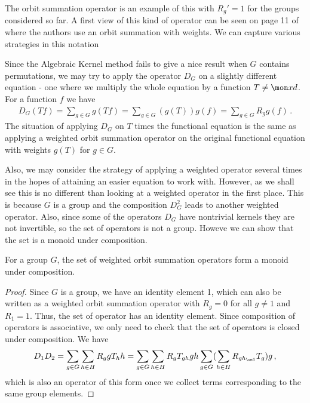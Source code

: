 The orbit summation operator is an example of this with $R_g' = 1$ for the groups considered so far. A first view of this kind of operator can be seen on page 11 of \cite{wong2014confining} where the authors use an orbit summation with weights. We can capture various strategies in this notation
\begin{example} Since the Algebraic Kernel method fails to give a nice result when $G$ contains permutations, we may try to apply the operator $D_G$ on a slightly different equation - one where we multiply the whole equation by a function $T \neq \mon xd$. For a function $f$ we have
\begin{align}
	D_G(Tf) = \sum_{g\in G}g(T f) = \sum_{g\in G} ( g(T)) g(f) =  \sum_{g\in G} R_g g(f)\,.
\end{align}
The situation of applying $D_G$ on $T$ times the functional equation is the same as applying a weighted orbit summation operator on the original functional equation with weights $g(T)$ for $g \in G$.
\end{example}
Also, we may consider the strategy of applying a weighted operator several times in the hopes of attaining an easier equation to work with. However, as we shall see this is no different than looking at a weighted operator in the first place. This is because $G$ is a group and the composition $D_G^2$ leads to another weighted operator. Also, since some of the operators $D_G$ have nontrivial kernels they are not invertible, so the set of operators is not a group. Howeve we can show that the set is a monoid under composition.
\begin{prop} For a group $G$, the set of weighted orbit summation operators form a monoid under composition.
\end{prop}
\begin{proof} Since $G$ is a group, we have an identity element 1, which can also be written as a weighted orbit summation operator with $R_g = 0$ for all $g\neq 1$ and $R_1 = 1$. Thus, the set of operator has an identity element. Since composition of operators is associative, we only need to check that the set of operators is closed under composition. We have
\begin{align}
	D_1D_2 = \sum_{g\in G}\sum_{h\in H} R_g gT_h h = \sum_{g\in G}\sum_{h\in H} R_g T_{gh} gh \sum_{g\in G}(\sum_{h\in H} R_{gh_{\um 1}} T_{g}) g\,,
\end{align}
which is also an operator of this form once we collect terms corresponding to the same group elements.
\end{proof}


